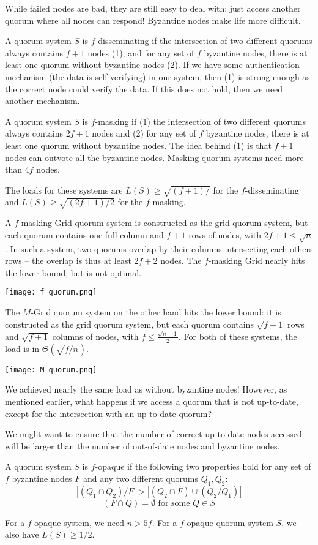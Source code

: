 While failed nodes are bad, they are still easy to deal with: just access another quorum where all nodes can respond! Byzantine nodes make life more difficult. \medskip

A quorum system $S$ is $f$-disseminating if the intersection of two different quorums always contains $f + 1$ nodes (1), and for any set of $f$ byzantine nodes, there is at least one quorum without byzantine nodes (2). If we have some authentication mechanism (the data is self-verifying) in our system, then (1) is strong enough as the correct node could verify the data. If this does not hold, then we need another mechanism. \medskip

A quorum system $S$ is $f$-masking if (1) the intersection of two different quorums always contains $2f + 1$ nodes and (2) for any set of $f$ byzantine nodes, there is at least one quorum without byzantine nodes. The idea behind (1) is that $f + 1$ nodes can outvote all the byzantine nodes. Masking quorum systems need more than $4f$ nodes.\medskip

The loads for these systems are $L(S) \geq \sqrt{(f+1)/}$ for the $f$-disseminating and $L(S) \geq \sqrt{(2f+1)/2}$ for the $f$-masking. \medskip

A $f$-masking Grid quorum system is constructed as the grid quorum system, but each quorum contains one full column and $f + 1$ rows of nodes, with $2f + 1 \leq \sqrt{n}$. In such a system, two quorums overlap by their columns intersecting each others rows – the overlap is thus at least $2f + 2$ nodes. The $f$-masking Grid nearly hits the lower bound, but is not optimal.
\begin{center}
	\texttt{[image: f\_quorum.png]}
\end{center}

The $M$-Grid quorum system on the other hand hits the lower bound: it is constructed as the grid quorum system, but each quorum contains $\sqrt{f + 1}$ rows and $\sqrt{f + 1}$ columns of nodes, with $f \leq \frac{\sqrt{n-1}}{2}$. For both of these systems, the load is in $\Theta(\sqrt{f/n})$.
\begin{center}
	\texttt{[image: M-quorum.png]}
\end{center}

We achieved nearly the same load as without byzantine nodes! However, as mentioned earlier, what happens if we access a quorum that is not up-to-date, except for the intersection with an up-to-date quorum? \medskip

We might want to ensure that the number of correct up-to-date nodes accessed will be larger than the number of out-of-date nodes and byzantine nodes. \medskip

A quorum system $S$ is $f$-opaque if the following two properties hold for any set of $f$ byzantine nodes $F$ and any two different quorums $Q_1, Q_2$:
$$|(Q_1 \cap Q_2) / F| > |(Q_2 \cap F) \cup (Q_2 / Q_1)| $$
$$(F \cap Q) = \emptyset \text{ for some } Q \in S$$

For a $f$-opaque system, we need $n > 5f$. For a $f$-opaque quorum system $S$, we also have $L(S) \geq 1/2$.



